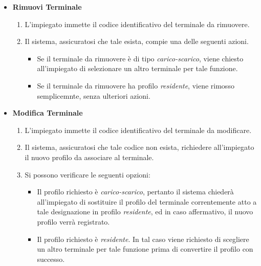 \documentclass[12pt, letterpaper]{article}
\begin{document}
\begin{itemize}
    \begin{itemize}
        \item \textbf{Rimuovi Terminale}
        \begin{enumerate}
            \item L'impiegato immette il codice identificativo del terminale da rimuovere.
            \item Il sistema, assicuratosi che tale esista, compie una delle seguenti azioni.
            \begin{itemize}
                \item Se il terminale da rimuovere è di tipo \emph{carico-scarico}, viene chiesto all'impiegato di selezionare un altro terminale per tale funzione.
                \item Se il terminale da rimuovere ha profilo \emph{residente}, viene rimosso semplicemnte, senza ulteriori azioni.
            \end{itemize}
        \end{enumerate}
    \end{itemize}

    \begin{itemize}
        \item \textbf{Modifica Terminale}
        \begin{enumerate}
            \item L'impiegato immette il codice identificativo del terminale da modificare.
            \item Il sistema, assicuratosi che tale codice non esista, richiedere all'impiegato il nuovo profilo da associare al terminale.
            \item Si possono verificare le seguenti opzioni:
            \begin{itemize}
                \item Il profilo richiesto è \emph{carico-scarico}, pertanto il sistema chiederà all'impiegato di sostituire il profilo del terminale correntemente atto a tale designazione in profilo \emph{residente}, ed in caso affermativo, il nuovo profilo verrà registrato.
                \item Il profilo richiesto è \emph{residente}. In tal caso viene richiesto di scegliere un altro terminale per tale funzione prima di convertire il profilo con successo.
            \end{itemize}
        \end{enumerate}
    \end{itemize}
\end{itemize}
\end{document}
